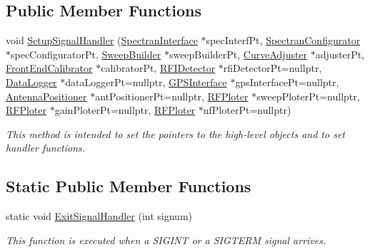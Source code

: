 \subsection*{Public Member Functions}
\begin{DoxyCompactItemize}
\item 
\mbox{\label{classSignalHandler_aac189962a11b36ed582bd837b99e503b}} 
void \hyperlink{classSignalHandler_aac189962a11b36ed582bd837b99e503b}{Setup\+Signal\+Handler} (\hyperlink{classSpectranInterface}{Spectran\+Interface} $\ast$spec\+Interf\+Pt, \hyperlink{classSpectranConfigurator}{Spectran\+Configurator} $\ast$spec\+Configurator\+Pt, \hyperlink{classSweepBuilder}{Sweep\+Builder} $\ast$sweep\+Builder\+Pt, \hyperlink{classCurveAdjuster}{Curve\+Adjuster} $\ast$adjuster\+Pt, \hyperlink{classFrontEndCalibrator}{Front\+End\+Calibrator} $\ast$calibrator\+Pt, \hyperlink{classRFIDetector}{R\+F\+I\+Detector} $\ast$rfi\+Detector\+Pt=nullptr, \hyperlink{classDataLogger}{Data\+Logger} $\ast$data\+Logger\+Pt=nullptr, \hyperlink{classGPSInterface}{G\+P\+S\+Interface} $\ast$gps\+Interface\+Pt=nullptr, \hyperlink{classAntennaPositioner}{Antenna\+Positioner} $\ast$ant\+Positioner\+Pt=nullptr, \hyperlink{classRFPloter}{R\+F\+Ploter} $\ast$sweep\+Ploter\+Pt=nullptr, \hyperlink{classRFPloter}{R\+F\+Ploter} $\ast$gain\+Ploter\+Pt=nullptr, \hyperlink{classRFPloter}{R\+F\+Ploter} $\ast$nf\+Ploter\+Pt=nullptr)
\begin{DoxyCompactList}\small\item\em This method is intended to set the pointers to the high-\/level objects and to set handler functions. \end{DoxyCompactList}\end{DoxyCompactItemize}
\subsection*{Static Public Member Functions}
\begin{DoxyCompactItemize}
\item 
static void \hyperlink{classSignalHandler_af32b7213b43fd13fa12587a0c0d9b565}{Exit\+Signal\+Handler} (int signum)
\begin{DoxyCompactList}\small\item\em This function is executed when a S\+I\+G\+I\+NT or a S\+I\+G\+T\+E\+RM signal arrives. \end{DoxyCompactList}\end{DoxyCompactItemize}
